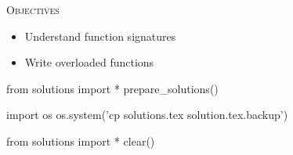 
\textsc{Objectives}
\begin{itemize}
\item Understand function signatures
\item Write overloaded functions
\end{itemize}







\begin{python0}
from solutions import *
prepare_solutions()
\end{python0}
\begin{python}
import os
os.system('cp solutions.tex solution.tex.backup')  
\end{python}

\begin{python0}
from solutions import *
clear()
\end{python0}
